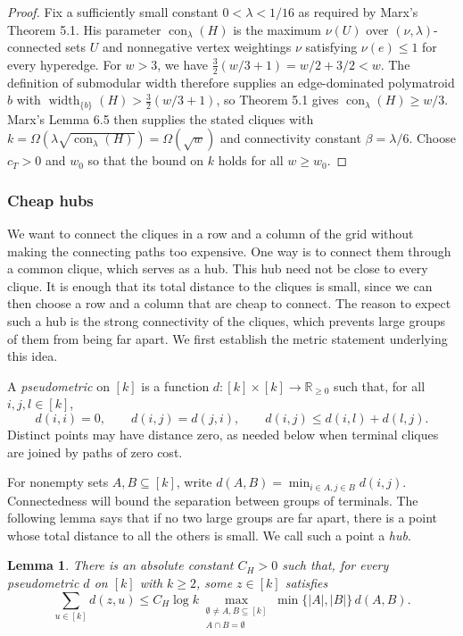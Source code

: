 \documentclass[11pt,letterpaper]{article}
\newtheorem{lemma}[lemma]{Lemma}
\theoremstyle{definition}
\theoremstyle{remark}
\begin{document}
\begin{proof}
Fix a sufficiently small constant $0<\lambda<1/16$ as required by
Marx's Theorem 5.1. His parameter $\operatorname{con}_\lambda(H)$ is the
maximum $\nu(U)$ over $(\nu,\lambda)$-connected sets $U$ and nonnegative
vertex weightings $\nu$ satisfying $\nu(e)\le1$ for every hyperedge.
For $w>3$, we have $\frac32(w/3+1)=w/2+3/2<w$. The definition of
submodular width therefore supplies an edge-dominated polymatroid $b$
with $\operatorname{width}_{\{b\}}(H)>\frac32(w/3+1)$, so Theorem 5.1 gives
$\operatorname{con}_\lambda(H)\ge w/3$.
Marx's Lemma 6.5 then supplies the stated cliques with
$k=\Omega(\lambda\sqrt{\operatorname{con}_\lambda(H)})=\Omega(\sqrt w)$
and connectivity constant $\beta=\lambda/6$. Choose $c_T>0$ and $w_0$
so that the bound on $k$ holds for all $w\ge w_0$.
\end{proof}

\subsubsection{Cheap hubs}\label{sec:metric}

We want to connect the cliques in a row and a column of the grid without
making the connecting paths too expensive. One way is to connect them
through a common clique, which serves as a hub. This hub need not be close
to every clique. It is enough that its total distance to the cliques is
small, since we can then choose a row and a column that are cheap to
connect. The reason to expect such a hub is the strong connectivity of
the cliques, which prevents large groups of them from being far apart.
We first establish the metric statement underlying this idea.


A \emph{pseudometric} on $[k]$ is a function
$d:[k]\times[k]\to\mathbb R_{\ge0}$ such that, for all $i,j,l\in[k]$,
\[
 d(i,i)=0,\qquad d(i,j)=d(j,i),\qquad
 d(i,j)\le d(i,l)+d(l,j).
\]
Distinct points may have distance zero, as needed below when terminal
cliques are joined by paths of zero cost.

For nonempty sets $A,B\subseteq[k]$, write
$d(A,B)=\min_{i\in A,j\in B}d(i,j)$. Connectedness will bound
the separation between groups of terminals. The following lemma says
that if no two large groups are far apart, there is a point whose total
distance to all the others is small. We call such a point a \emph{hub}.

\begin{lemma}\label{lem:hub}
There is an absolute constant $C_H>0$ such that, for every pseudometric
$d$ on $[k]$ with $k\ge2$, some $z\in[k]$ satisfies
\begin{equation}\label{eq:hub}
 \sum_{u\in[k]}d(z,u)\le C_H\log k
 \max_{\substack{\emptyset\ne A,B\subseteq[k]\\A\cap B=\emptyset}}
       \min\{|A|,|B|\}\,d(A,B).
\end{equation}
\end{lemma}
\end{document}
